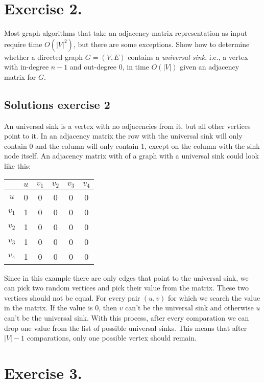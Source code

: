 \documentclass{article}
\begin{document}
\section*{Exercise 2.}

Most graph algorithms that take an adjacency-matrix representation
as input require time $O(|V|^2)$, but there are some exceptions. Show
how to determine whether a directed graph $G = (V,E)$ contains a \emph{universal sink}, i.e., a vertex with in-degree $n - 1$ and out-degree $0$, in time $O(|V|)$ given an adjacency matrix for $G$.

\subsection*{Solutions exercise 2}
An universal sink is a vertex with no adjacencies from it, but all other vertices point to it. In an adjacency matrix the row with the universal sink will only contain 0 and the column will only contain 1, except on the column with the sink node itself. An adjacency matrix with of a graph with a universal sink could look like this:

\vspace{0.2cm}
\begin{center}
    \begin{tabular}{c|c|c|c|c|c|}
         & $u$ & $v_1$ & $v_2$ & $v_3$ & $v_4$ \\
        \hline
        $u$     & 0 & 0 & 0 & 0 & 0\\
        $v_1$   & 1 & 0 & 0 & 0 & 0 \\
        $v_2$   & 1 & 0 & 0 & 0 & 0 \\
        $v_3$   & 1 & 0 & 0 & 0 & 0 \\
        $v_4$   & 1 & 0 & 0 & 0 & 0 \\
    \end{tabular}
\end{center}
\vspace{0.2cm}
Since in this example there are only edges that point to the universal sink, we can pick two random vertices and pick their value from the matrix. These two vertices should not be equal. For every pair $(u, v)$ for which we search the value in the matrix. If the value is 0, then $v$ can't be the universal sink and otherwise $u$ can't be the universal sink. With this process, after every comparation we can drop one value from the list of possible universal sinks. This means that after $|V| - 1$ comparations, only one possible vertex should remain.
\newpage
\section*{Exercise 3.}
\end{document}
